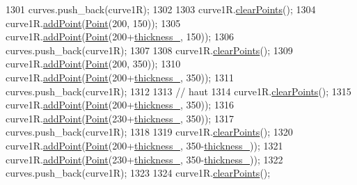 \begin{DoxyCode}
1301     curves.push\_back(curve1R);
1302 
1303     curve1R.\mbox{\hyperlink{class_bezier_curve_a0ba8ce66d5af5971ae6a1b506029728e}{clearPoints}}();
1304     curve1R.\mbox{\hyperlink{class_bezier_curve_a38d16c18b36ae45619b05e26e226cf34}{addPoint}}(\mbox{\hyperlink{class_point}{Point}}(200, 150));
1305     curve1R.\mbox{\hyperlink{class_bezier_curve_a38d16c18b36ae45619b05e26e226cf34}{addPoint}}(\mbox{\hyperlink{class_point}{Point}}(200+\mbox{\hyperlink{class_font_v1_aed8040e76be9a52833627b92f0fb4e5f}{thickness\_}}, 150));
1306     curves.push\_back(curve1R);
1307 
1308     curve1R.\mbox{\hyperlink{class_bezier_curve_a0ba8ce66d5af5971ae6a1b506029728e}{clearPoints}}();
1309     curve1R.\mbox{\hyperlink{class_bezier_curve_a38d16c18b36ae45619b05e26e226cf34}{addPoint}}(\mbox{\hyperlink{class_point}{Point}}(200, 350));
1310     curve1R.\mbox{\hyperlink{class_bezier_curve_a38d16c18b36ae45619b05e26e226cf34}{addPoint}}(\mbox{\hyperlink{class_point}{Point}}(200+\mbox{\hyperlink{class_font_v1_aed8040e76be9a52833627b92f0fb4e5f}{thickness\_}}, 350));
1311     curves.push\_back(curve1R);
1312 
1313     \textcolor{comment}{// haut}
1314     curve1R.\mbox{\hyperlink{class_bezier_curve_a0ba8ce66d5af5971ae6a1b506029728e}{clearPoints}}();
1315     curve1R.\mbox{\hyperlink{class_bezier_curve_a38d16c18b36ae45619b05e26e226cf34}{addPoint}}(\mbox{\hyperlink{class_point}{Point}}(200+\mbox{\hyperlink{class_font_v1_aed8040e76be9a52833627b92f0fb4e5f}{thickness\_}}, 350));
1316     curve1R.\mbox{\hyperlink{class_bezier_curve_a38d16c18b36ae45619b05e26e226cf34}{addPoint}}(\mbox{\hyperlink{class_point}{Point}}(230+\mbox{\hyperlink{class_font_v1_aed8040e76be9a52833627b92f0fb4e5f}{thickness\_}}, 350));
1317     curves.push\_back(curve1R);
1318 
1319     curve1R.\mbox{\hyperlink{class_bezier_curve_a0ba8ce66d5af5971ae6a1b506029728e}{clearPoints}}();
1320     curve1R.\mbox{\hyperlink{class_bezier_curve_a38d16c18b36ae45619b05e26e226cf34}{addPoint}}(\mbox{\hyperlink{class_point}{Point}}(200+\mbox{\hyperlink{class_font_v1_aed8040e76be9a52833627b92f0fb4e5f}{thickness\_}}, 350-\mbox{\hyperlink{class_font_v1_aed8040e76be9a52833627b92f0fb4e5f}{thickness\_}}));
1321     curve1R.\mbox{\hyperlink{class_bezier_curve_a38d16c18b36ae45619b05e26e226cf34}{addPoint}}(\mbox{\hyperlink{class_point}{Point}}(230+\mbox{\hyperlink{class_font_v1_aed8040e76be9a52833627b92f0fb4e5f}{thickness\_}}, 350-\mbox{\hyperlink{class_font_v1_aed8040e76be9a52833627b92f0fb4e5f}{thickness\_}}));
1322     curves.push\_back(curve1R);
1323 
1324     curve1R.\mbox{\hyperlink{class_bezier_curve_a0ba8ce66d5af5971ae6a1b506029728e}{clearPoints}}();

\end{DoxyCode}
